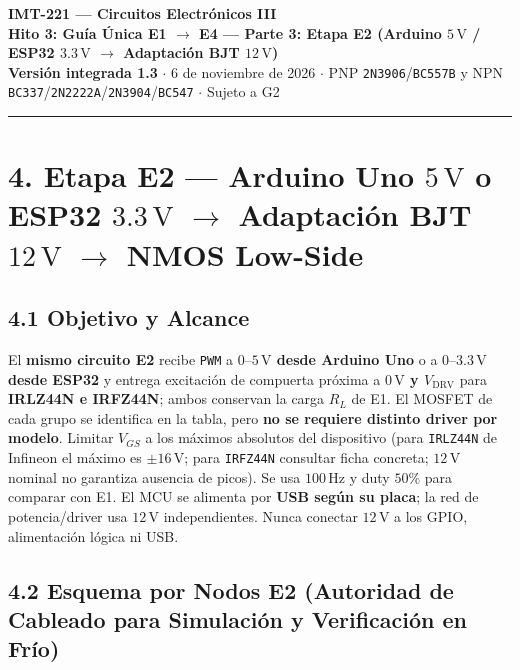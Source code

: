 \documentclass[10pt, a4paper, landscape]{article}
\begin{document}
\noindent
{\LARGE \textbf{\textcolor{ucbblue}{IMT-221 — Circuitos Electrónicos III}}}\\[0.12cm]
{\Large \textbf{Hito 3: Guía Única E1 $\rightarrow$ E4 — Parte 3: Etapa E2 (Arduino $5\,\text{V}$ / ESP32 $3.3\,\text{V}$ $\rightarrow$ Adaptación BJT $12\,\text{V}$)}}\\[0.08cm]
{\small \textbf{Versión integrada 1.3} $\cdot$ 6 de noviembre de 2026 $\cdot$ PNP \texttt{2N3906}/\texttt{BC557B} y NPN \texttt{BC337}/\texttt{2N2222A}/\texttt{2N3904}/\texttt{BC547} $\cdot$ Sujeto a G2}
\par\vspace{0.15cm}\noindent\rule{\linewidth}{0.4pt}\vspace{0.2cm}

\section*{4. Etapa E2 — Arduino Uno $5\,\text{V}$ o ESP32 $3.3\,\text{V}$ $\rightarrow$ Adaptación BJT $12\,\text{V}$ $\rightarrow$ NMOS Low-Side}

\subsection*{4.1 Objetivo y Alcance}
El \textbf{mismo circuito E2} recibe \texttt{PWM} a \textbf{$0\text{--}5\,\text{V}$ desde Arduino Uno} o a \textbf{$0\text{--}3.3\,\text{V}$ desde ESP32} y entrega excitación de compuerta próxima a \textbf{$0\,\text{V}$ y $V_{\text{DRV}}$} para \textbf{IRLZ44N e IRFZ44N}; ambos conservan la carga $R_L$ de E1. El MOSFET de cada grupo se identifica en la tabla, pero \textbf{no se requiere distinto driver por modelo}. Limitar $V_{GS}$ a los máximos absolutos del dispositivo (para \texttt{IRLZ44N} de Infineon el máximo es $\pm 16\,\text{V}$; para \texttt{IRFZ44N} consultar ficha concreta; $12\,\text{V}$ nominal no garantiza ausencia de picos). Se usa $100\,\text{Hz}$ y duty $50\%$ para comparar con E1. El MCU se alimenta por \textbf{USB según su placa}; la red de potencia/driver usa \textbf{$12\,\text{V}$} independientes. Nunca conectar $12\,\text{V}$ a los GPIO, alimentación lógica ni USB.

\subsection*{4.2 Esquema por Nodos E2 (Autoridad de Cableado para Simulación y Verificación en Frío)}
\end{document}
